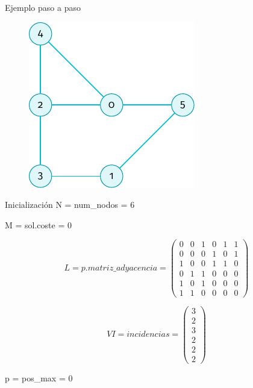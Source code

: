 \documentclass[spanish]{beamer}
\begin{document}
\begin{frame}{Ejemplo paso a paso}
	\begin{figure}[H]
		\centering \includegraphics{./img/grafo-ejemplo-sin-recubrir.pdf}
	\end{figure}

\end{frame}

\begin{frame}{Inicialización}
	N = num\_nodos = 6
	
	M = sol.coste = 0
	
	$$  L = p.matriz\_adyacencia = 
\begin{pmatrix}
  0 & 0 & 1 & 0 & 1 & 1 \\
  0 & 0 & 0 & 1 & 0 & 1 \\
  1 & 0 & 0 & 1 & 1 & 0 \\
  0 & 1 & 1 & 0 & 0 & 0 \\
  1 & 0 & 1 & 0 & 0 & 0 \\
  1 & 1 & 0 & 0 & 0 & 0
\end{pmatrix}$$

	$$  VI = incidencias = 
\begin{pmatrix}
  3 \\
  2 \\
  3 \\
  2 \\
  2 \\
  2
\end{pmatrix}$$

	p = pos\_max = 0
	
\end{frame}
\end{document}
